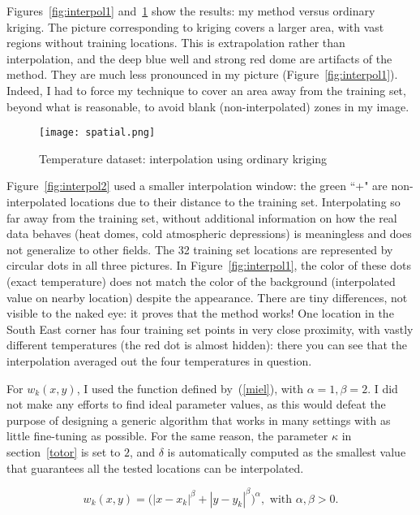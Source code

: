 \documentclass[oneside,10pt]{book}
\begin{document}
Figures~\ref{fig:interpol1} and~\ref{fig:spatial} show the results: my method versus ordinary kriging. The picture corresponding to
 kriging covers a larger area, with vast regions without training locations. This is extrapolation rather than interpolation, and the deep blue well and strong red dome are artifacts of the method. They are much less pronounced in my picture (Figure~\ref{fig:interpol1}). Indeed, I had to force my technique to cover an area away from the training set, beyond what is 
reasonable, to avoid blank (non-interpolated) zones in my image.  

\begin{figure}%
\centering
\texttt{[image: spatial.png]} %
\caption{Temperature dataset: interpolation using ordinary kriging}
\label{fig:spatial}
\end{figure}

Figure~\ref{fig:interpol2} used a smaller interpolation window: the green ``+" are non-interpolated locations due to their distance to the training set. Interpolating so far away from the training set, without additional information on how the real data behaves (heat domes, cold atmospheric depressions) is meaningless and does not generalize to other fields.  The 32 training set locations are represented by circular dots in all three pictures.  In Figure~\ref{fig:interpol1}, the color of these dots (exact temperature) does not match the color of the background (interpolated value on nearby location) despite the appearance. There are tiny differences, not visible to the naked eye: it proves that the method works! One location in the South East corner has four training set points in very close proximity, with vastly different temperatures (the red dot is almost hidden): there you can see that the interpolation averaged out the four temperatures in question.

For $w_k(x,y)$, I used the function defined by~(\ref{miel}), with $\alpha=1,\beta=2$. I did not make any efforts to find ideal parameter values, as this would defeat the purpose of designing a generic algorithm that works in many settings with as little fine-tuning as possible. For the same reason, the parameter $\kappa$ in section~\ref{totor} is set to $2$, and $\delta$ is automatically computed as the smallest value that guarantees all the tested locations can be interpolated.

\begin{equation}
w_k(x,y) = \Big(|x-x_k|^\beta + |y-y_k|^\beta\Big)^\alpha, \text{ with } \alpha,\beta > 0. \label{miel}
\end{equation}
\end{document}
